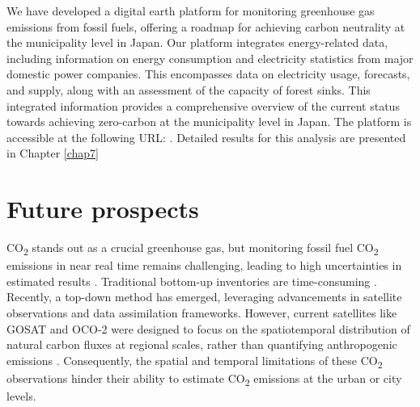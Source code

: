 We have developed a digital earth platform for monitoring greenhouse gas emissions from fossil fuels, offering a roadmap for achieving carbon neutrality at the municipality level in Japan. Our platform integrates energy-related data, including information on energy consumption and electricity statistics from major domestic power companies. This encompasses data on electricity usage, forecasts, and supply, along with an assessment of the capacity of forest sinks. This integrated information provides a comprehensive overview of the current status towards achieving zero-carbon at the municipality level in Japan. The platform is accessible at the following URL: \citep{http://de14.digitalasia.chubu.ac.jp/}. Detailed results for this analysis are presented in Chapter \ref{chap7}\par

\section{Future prospects}
CO\textsubscript{2} stands out as a crucial greenhouse gas, but monitoring fossil fuel CO\textsubscript{2} emissions in near real time remains challenging, leading to high uncertainties in estimated results \citep{marland2008uncertainties}. Traditional bottom-up inventories are time-consuming \citep{marland2008uncertainties}. Recently, a top-down method has emerged, leveraging advancements in satellite observations and data assimilation frameworks. However, current satellites like GOSAT and OCO-2 were designed to focus on the spatiotemporal distribution of natural carbon fluxes at regional scales, rather than quantifying anthropogenic emissions \citep{nassar2017quantifying, yang2023using}. Consequently, the spatial and temporal limitations of these CO\textsubscript{2} observations hinder their ability to estimate CO\textsubscript{2} emissions at the urban or city levels. \par

